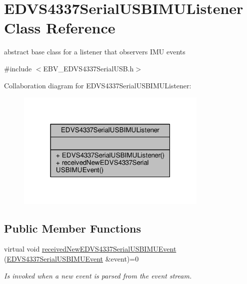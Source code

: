 \hypertarget{class_e_d_v_s4337_serial_u_s_b_i_m_u_listener}{}\section{E\+D\+V\+S4337\+Serial\+U\+S\+B\+I\+M\+U\+Listener Class Reference}
\label{class_e_d_v_s4337_serial_u_s_b_i_m_u_listener}


abstract base class for a listener that observers I\+M\+U events  




{\ttfamily \#include $<$E\+B\+V\+\_\+\+E\+D\+V\+S4337\+Serial\+U\+S\+B.\+h$>$}



Collaboration diagram for E\+D\+V\+S4337\+Serial\+U\+S\+B\+I\+M\+U\+Listener\+:
\nopagebreak
\begin{figure}[H]
\begin{center}
\leavevmode
\includegraphics[width=259pt]{class_e_d_v_s4337_serial_u_s_b_i_m_u_listener__coll__graph}
\end{center}
\end{figure}
\subsection*{Public Member Functions}
\begin{DoxyCompactItemize}
\item 
\hypertarget{class_e_d_v_s4337_serial_u_s_b_i_m_u_listener_a6af28f0e3817f55e5dbc3640d9aea378}{}virtual void \hyperlink{class_e_d_v_s4337_serial_u_s_b_i_m_u_listener_a6af28f0e3817f55e5dbc3640d9aea378}{received\+New\+E\+D\+V\+S4337\+Serial\+U\+S\+B\+I\+M\+U\+Event} (\hyperlink{struct_e_d_v_s4337_serial_u_s_b_i_m_u_event}{E\+D\+V\+S4337\+Serial\+U\+S\+B\+I\+M\+U\+Event} \&event)=0\label{class_e_d_v_s4337_serial_u_s_b_i_m_u_listener_a6af28f0e3817f55e5dbc3640d9aea378}

\begin{DoxyCompactList}\small\item\em Is invoked when a new event is parsed from the event stream. \end{DoxyCompactList}\end{DoxyCompactItemize}



